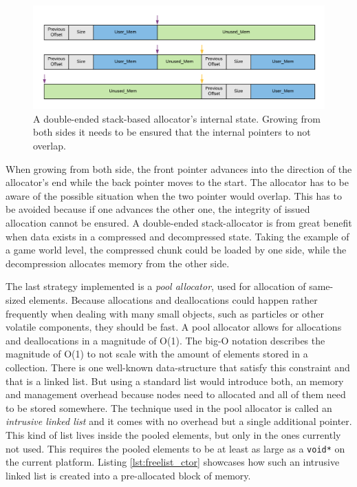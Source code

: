 \begin{figure}[h!]
	\centering \includegraphics[width=\linewidth]{PICs/double_stack_alloc.png}
	\caption{A double-ended stack-based allocator's internal state. Growing from both sides it needs to be ensured that the internal pointers to not overlap.}
	\label{fig:double_stack_alloc}
\end{figure}

\noindent
When growing from both side, the front pointer advances into the direction of the allocator's end while the back pointer moves to the start. The allocator has to be aware of the possible situation when the two pointer would overlap. This has to be avoided because if one advances the other one, the integrity of issued allocation cannot be ensured. A double-ended stack-allocator is from great benefit when data exists in a compressed and decompressed state. Taking the example of a game world level, the compressed chunk could be loaded by one side, while the decompression allocates memory from the other side.

The last strategy implemented is a \textit{pool allocator}, used for allocation of same-sized elements. Because allocations and deallocations could happen rather frequently when dealing with many small objects, such as particles or other volatile components, they should be fast. A pool allocator allows for allocations and deallocations in a magnitude of O(1). The big-O notation describes the magnitude of O(1) to not scale with the amount of elements stored in a collection. There is one well-known data-structure that satisfy this constraint and that is a linked list. But using a standard list would introduce both, an memory and management overhead because nodes need to allocated and all of them need to be stored somewhere. The technique used in the pool allocator is called an \textit{intrusive linked list} and it comes with no overhead but a single additional pointer. This kind of list lives inside the pooled elements, but only in the ones currently not used. This requires the pooled elements to be at least as large as a \texttt{void*} on the current platform. Listing \ref{lst:freelist_ctor} showcases how such an intrusive linked list is created into a pre-allocated block of memory.\\

